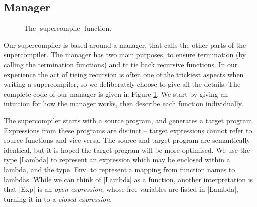 \documentclass[draft]{sigplanconf}
\begin{document}
\subsection{Manager}
\label{sec:manager}

\begin{figure}
\caption{The |supercompile| function.}
\label{fig:manager}
\end{figure}

Our supercompiler is based around a manager, that calls the other parts of the supercompiler. The manager has two main purposes, to ensure termination (by calling the termination functions) and to tie back recursive functions. In our experience the act of tieing recursion is often one of the trickiest aspects when writing a supercompiler, so we deliberately choose to give all the details. The complete code of our manager is given in Figure \ref{fig:manager}. We start by giving an intuition for how the manager works, then describe each function individually.

The supercompiler starts with a source program, and generates a target program. Expressions from these programs are distinct -- target expressions cannot refer to source functions and vice versa. The source and target program are semantically identical, but it is hoped the target program will be more optimised. We use the type |Lambda| to represent an expression which may be enclosed within a lambda, and the type |Env| to represent a mapping from function names to lambdas. While we can think of |Lambda| as a function, another interpretation is that |Exp| is an \textit{open expression}, whose free variables are listed in |Lambda|, turning it in to a \textit{closed expression}.
\end{document}
